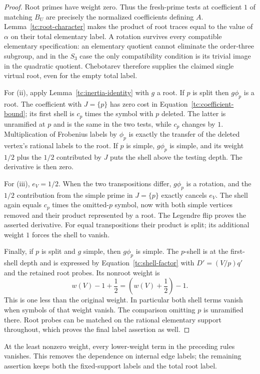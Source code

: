 \begin{proof}
Root primes have weight zero.  Thus the fresh-prime tests at
coefficient $1$ of matching $B_U$ are precisely the normalized
coefficients defining $A$.  Lemma~\ref{tc:root-character} makes
the product of root traces equal to the value of $\alpha$ on
their total elementary label.  A rotation survives every
compatible elementary specification: an elementary quotient
cannot eliminate the order-three subgroup, and in the $S_3$
case the only compatibility condition is its trivial image in
the quadratic quotient.  Chebotarev therefore supplies the
claimed single virtual root, even for the empty total label.

For (ii), apply Lemma~\ref{tc:inertia-identity} with $g$ a root.
If $p$ is split then $g\phi_p$ is a root.  The coefficient with
$J=\{p\}$ has zero cost in
Equation~\eqref{tc:coefficient-bound}; its first shell is
$c_p$ times the symbol with $p$ deleted.  The latter is
unramified at $p$ and is the same in the two tests, while $c_p$
changes by $1$.  Multiplication of Frobenius labels by $\phi_p$
is exactly the transfer of the deleted vertex's rational labels
to the root.  If $p$ is simple, $g\phi_p$ is simple, and its
weight $1/2$ plus the $1/2$ contributed by $J$ puts the shell
above the testing depth.  The derivative is then zero.

For (iii), $e_V=1/2$.  When the two transpositions differ,
$g\phi_p$ is a rotation, and the $1/2$ contribution from the
simple prime in $J=\{p\}$ exactly cancels $e_V$.  The shell
again equals $c_p$ times the omitted-$p$ symbol, now with both
simple vertices removed and their product represented by a
root.  The Legendre flip proves the asserted derivative.
For equal transpositions their product is split; its additional
weight $1$ forces the shell to vanish.

Finally, if $p$ is split and $g$ simple, then $g\phi_p$ is
simple.  The $p$-shell is at the first-shell depth and is
expressed by Equation~\eqref{tc:shell-factor} with
$D'=(V/p)q'$ and the retained root probes.  Its nonroot weight
is
\[
                 w(V)-1+\frac12
                  =\left(w(V)+\frac12\right)-1.
\]
This is one less than the original weight.  In particular both
shell terms vanish when symbols of that weight vanish.  The
comparison omitting $p$ is unramified there.  Root probes can
be matched on the rational elementary support throughout,
which proves the final label assertion as well.
\end{proof}

At the least nonzero weight, every lower-weight term in the preceding
rules vanishes. This removes the dependence on internal edge labels;
the remaining assertion keeps both the fixed-support labels and the
total root label.

